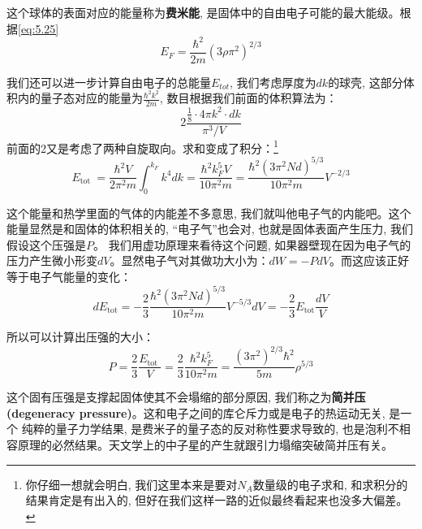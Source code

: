 这个球体的表面对应的能量称为\textbf{费米能}, 是固体中的自由电子可能的最大能级。根据\ref{eq:5.25}
\begin{equation}
    \label{eq:5.28}
    E_{F}=\frac{\hbar^{2}}{2 m}\left(3 \rho \pi^{2}\right)^{2 / 3}
\end{equation}

我们还可以进一步计算自由电子的总能量$E_{tot}$, 我们考虑厚度为$dk$的球壳, 这部分体积内的量子态对应的能量为$\frac{\hbar^2k^2}{2m}$, 数目根据我们前面的体积算法为：
\begin{equation}
    2\frac{\frac{1}{8}\cdot4\pi k^2\cdot dk}{\pi^3/V}
\end{equation}
前面的2又是考虑了两种自旋取向。求和变成了积分：\footnote{你仔细一想就会明白, 我们这里本来是要对$N_A$数量级的电子求和, 和求积分的结果肯定是有出入的, 但好在我们这样一路的近似最终看起来也没多大偏差。}
\begin{equation}
    \label{eq:5.30}
    E_{\text {tot }}=\frac{\hbar^{2} V}{2 \pi^{2} m} \int_{0}^{k_{F}} k^{4} d k=\frac{\hbar^{2} k_{F}^{5} V}{10 \pi^{2} m}=\frac{\hbar^{2}\left(3 \pi^{2} N d\right)^{5 / 3}}{10 \pi^{2} m} V^{-2 / 3}
\end{equation}

这个能量和热学里面的气体的内能差不多意思, 我们就叫他电子气的内能吧。这个能量显然是和固体的体积相关的, “电子气”也会对, 也就是固体表面产生压力, 我们假设这个压强是$P$。
我们用虚功原理来看待这个问题, 如果器壁现在因为电子气的压力产生微小形变$dV$。显然电子气对其做功大小为：$dW=-PdV$。而这应该正好等于电子气能量的变化：
\begin{equation}
    d E_{\mathrm{tot}}=-\frac{2}{3} \frac{\hbar^{2}\left(3 \pi^{2} N d\right)^{5 / 3}}{10 \pi^{2} m} V^{-5 / 3} d V=-\frac{2}{3} E_{\mathrm{tot}} \frac{d V}{V}
\end{equation}

所以可以计算出压强的大小：
\begin{equation}
    \label{eq:5.32}
    P=\frac{2}{3} \frac{E_{\text {tot }}}{V}=\frac{2}{3} \frac{\hbar^{2} k_{F}^{5}}{10 \pi^{2} m}=\frac{\left(3 \pi^{2}\right)^{2 / 3} \hbar^{2}}{5 m} \rho^{5 / 3}
\end{equation}

这个固有压强是支撑起固体使其不会塌缩的部分原因, 我们称之为\textbf{简并压(degeneracy pressure)}。这和电子之间的库仑斥力或是电子的热运动无关, 是一个
纯粹的量子力学结果, 是费米子的量子态的反对称性要求导致的, 也是泡利不相容原理的必然结果。天文学上的中子星的产生就跟引力塌缩突破简并压有关。

